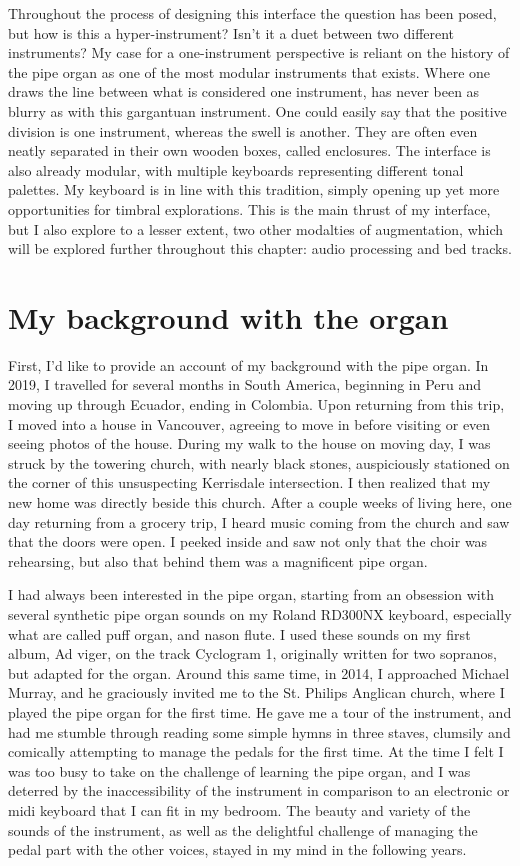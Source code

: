 \documentclass[12pt,twoside,maitrise]{dms}
\theoremstyle{definition}
\begin{document}
Throughout the process of designing this interface the question has been posed, but how is this a hyper-instrument?
Isn't it a duet between two different instruments?
My case for a one-instrument perspective is reliant on the history of the pipe organ as one of the most modular instruments that exists.
Where one draws the line between what is considered one instrument, has never been as blurry as with this gargantuan instrument.
One could easily say that the positive division is one instrument, whereas the swell is another.
They are often even neatly separated in their own wooden boxes, called enclosures.
The interface is also already modular, with multiple keyboards representing different tonal palettes.
My keyboard is in line with this tradition, simply opening up yet more opportunities for timbral explorations.
This is the main thrust of my interface, but I also explore to a lesser extent, two other modalties of augmentation, which will be explored further throughout this chapter: audio processing and bed tracks.

\section{My background with the organ}
First, I’d like to provide an account of my background with the pipe organ.
In 2019, I travelled for several months in South America, beginning in Peru and moving up through Ecuador, ending in Colombia.
Upon returning from this trip, I moved into a house in Vancouver, agreeing to move in before visiting or even seeing photos of the house.
During my walk to the house on moving day, I was struck by the towering church, with nearly black stones, auspiciously stationed on the corner of this unsuspecting Kerrisdale intersection.
I then realized that my new home was directly beside this church.
After a couple weeks of living here, one day returning from a grocery trip, I heard music coming from the church and saw that the doors were open.
I peeked inside and saw not only that the choir was rehearsing, but also that behind them was a magnificent pipe organ.

I had always been interested in the pipe organ, starting from an obsession with several synthetic pipe organ sounds on my Roland RD300NX keyboard, especially what are called puff organ, and nason flute.
I used these sounds on my first album, Ad viger, on the track Cyclogram 1, originally written for two sopranos, but adapted for the organ.
Around this same time, in 2014, I approached Michael Murray, and he graciously invited me to the St.
Philips Anglican church, where I played the pipe organ for the first time.
He gave me a tour of the instrument, and had me stumble through reading some simple hymns in three staves, clumsily and comically attempting to manage the pedals for the first time.
At the time I felt I was too busy to take on the challenge of learning the pipe organ, and I was deterred by the inaccessibility of the instrument in comparison to an electronic or midi keyboard that I can fit in my bedroom.
The beauty and variety of the sounds of the instrument, as well as the delightful challenge of managing the pedal part with the other voices,  stayed in my mind in the following years.
\end{document}
